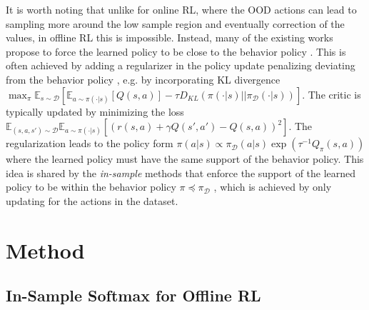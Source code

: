 \documentclass{article}
\newcommand{\AdaBracket}[1]{\left(#1\right)}
\newcommand{\AdaRectBracket}[1]{\left[#1\right]}
\newcommand{\expectation}[2]{\mathbb{E}_{#1}\AdaRectBracket{#2}}
\newcommand{\KLany}[2]{D_{\!K\!L}\!\left(#1 \left|  \right| #2 \right)}
\newcommand{\datasetPolicy}{\pi_{\mathcal{D}}}
\begin{document}
It is worth noting that unlike for online RL, where the OOD actions can lead to sampling more around the low sample region and eventually correction of the values, in offline RL this is impossible.
Instead, many of the existing works propose to force the learned policy to be close to the behavior policy \cite{Dadashi2021-pseudoMetricOffline,Fujimoto2019-InSampleMax,Fujimoto2021-minimalist,Nair2021-awac}.
This is often achieved by adding a regularizer in the policy update penalizing deviating from the behavior policy \cite{Ghasemipour2021-EMaQ,Kumar2019-BootstrapErrorQlearningMMD,Jaques2020-OfflineDialog,Wu2020-BehaviorRegularizedAC}, e.g. by incorporating KL divergence $\max_{\pi}\expectation{s\sim\mathcal{D}}{\expectation{a\sim\pi(\cdot|s)}{Q(s,a)} - \tau\KLany{\pi(\cdot|s)}{\datasetPolicy(\cdot|s)}}$.
The critic is typically updated by minimizing the loss $\mathbb{E}_{(s,a,s')\sim \mathcal{D}}\expectation{a\sim\pi(\cdot|s)}{\AdaBracket{ r(s,a) + \gamma Q(s',a') - Q(s,a)}^2}$.
The regularization leads to the policy form $\pi(a|s)\propto\datasetPolicy(a|s)\exp\AdaBracket{\tau^{-1}Q_{\pi}(s,a)}$ where the learned policy must have the same support of the behavior policy.
This idea is shared by the \emph{in-sample} methods that enforce the support of the learned policy to be within the behavior policy $\pi \preceq \datasetPolicy$ \cite{Fujimoto2019-InSampleMax,Kostrikov2022-implicitQlearning,Xiao2023-InSampleSoftmax}, which is achieved by only updating for the actions in the dataset.



\section{Method}

\subsection{In-Sample Softmax for Offline RL}
\end{document}
